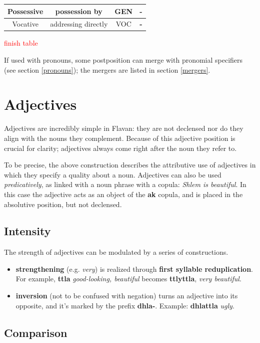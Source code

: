 \documentclass[10pt,oneside]{memoir}
\newcommand{\cmmnt}[1]{\textcolor{red}{#1}}
\begin{document}
\begin{center}
\begin{tabular}[]{ |  c | c | c | >{\bfseries}c | }
\hline\hline
Possessive & possession by & GEN & - \\
\hline\hline
Vocative & addressing directly & VOC & - \\
\hline\hline
\end{tabular} 
\end{center}

\cmmnt{finish table}

If used with pronouns, some postposition can merge with pronomial specifiers (see section \ref{pronouns}); the mergers are listed in section \ref{mergers}.


\section{Adjectives}

Adjectives are incredibly simple in Flavan: they are not declensed nor do they align with the nouns they complement. Because of this adjective position is crucial for clarity; adjectives always come right after the noun they refer to.

To be precise, the above construction describes the attributive use of adjectives in which they specify a quality about a noun. Adjectives can also be used \emph{predicatively}, as linked with a noun phrase with a copula: \emph{Shlem is beautiful}. In this case the adjective acts as an object of the \textbf{ak} copula, and is placed in the absolutive position, but not declensed. %


\subsection{Intensity}

The strength of adjectives can be modulated by a series of constructions.

\begin{itemize}
	\item \textbf{strengthening} (e.g. \emph{very}) is realized through \textbf{first syllable reduplication}. For example, \textbf{ttla} \emph{good-looking, beautiful} becomes \textbf{ttlyttla}, \emph{very beautiful}.
	\item \textbf{inversion} (not to be confused with negation) turns an adjective into its opposite, and it's marked by the prefix \textbf{dhla-}. Example: \textbf{dhlattla} \emph{ugly}.
\end{itemize}

\subsection{Comparison}
\end{document}
